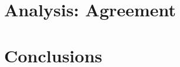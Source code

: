 \documentclass[11pt,a4paper]{article}
\begin{document}
\section{Analysis: Agreement}
\label{sec:analysis}



\section{Conclusions}
\label{sec:conc}




%
\end{document}
